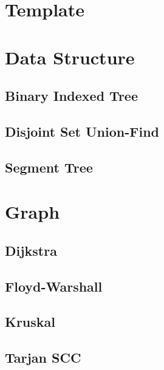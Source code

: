 \documentclass[twocolumn]{article}
\begin{document}
\setlength\parindent{0pt}

\tableofcontents

\pagestyle{fancy}
\fancyfoot{}
\fancyhead[R]{\thepage}

\section{Template}


\section{Data Structure}

\subsection{Binary Indexed Tree}


\subsection{Disjoint Set Union-Find}


\subsection{Segment Tree}


\section{Graph}

\subsection{Dijkstra}


\subsection{Floyd-Warshall}


\subsection{Kruskal}


\subsection{Tarjan SCC}

\end{document}
